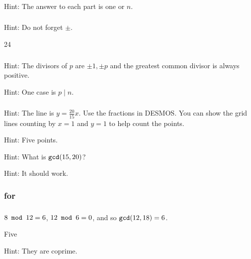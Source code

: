 \subsubsection*{ \answers}
    Hint: The answer to each part is one or $n$.

\subsubsection*{ \answers}
\begin{apart}
    \item Hint: Do not forget $\pm$.
    \item 24
\end{apart}

\subsubsection*{ \answers}
\begin{apart}
    \item Hint: The divisors of $p$ are $\pm 1, \pm p$ and the greatest common divisor is always positive.
    \item Hint:  One case is $p \mid n$.
\end{apart}

\subsubsection*{ \answers}
\begin{apart}
    \item Hint: The line is $y = \frac{20}{15}x$.  Use the fractions in DESMOS.  You can show the grid lines counting by $x=1$ and $y=1$ to help count the points.
    \item Hint: Five points.
    \item Hint: What is $\texttt{gcd}(15,20)$?
    \item Hint: It should work.
\end{apart}

\subsubsection{\answers for  \subea}

\subsubsection*{ \answers}
\begin{apart}
    \item $8 \texttt{ mod } 12 = 6$, $12 \texttt{ mod } 6 = 0$, and so $\texttt{gcd}(12,18)=6$.
    \item Five
    \item Hint: They are coprime.
\end{apart}

